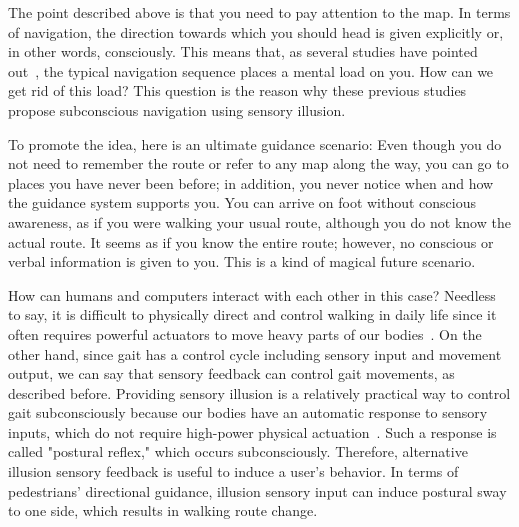 \documentclass{sigchi}
\begin{document}
The point described above is that you need to pay attention to the map. In terms of navigation, the direction towards which you should head is given explicitly or, in other words, consciously. This means that, as several studies have pointed out~\cite{Ghaem1997,PSYP:PSYP1043,1276842},
 the typical navigation sequence places a mental load on you. How can we get rid of this load? This question is the reason why these previous studies propose subconscious navigation using sensory illusion\cite{Tanikawa2012,%
TJP:TJP931,TJP:TJP1033,7460029,7989977,BENT2000157,Britton1993}.%

To promote the idea, here is an ultimate guidance scenario: Even though you do not need to remember the route or refer to any map along the way, you can go to places you have never been before; in addition, you never notice when and how the guidance system supports you. You can arrive on foot without conscious awareness, as if you were walking your usual route, although you do not know the actual route. It seems as if you know the entire route; however, no conscious or verbal information is given to you. This is a kind of magical future scenario.

How can humans and computers interact with each other in this case? Needless to say, it is difficult to physically direct and control walking in daily life since it often requires powerful actuators to move heavy parts of our bodies~\cite{doi:10.3109/03093648709078194,DOMINGO2009464}. On the other hand, since gait has a control cycle including sensory input and movement output, we can say that sensory feedback can control gait movements, as described before. Providing sensory illusion is a relatively practical way to control gait subconsciously because our bodies have an automatic response to sensory inputs, which do not require high-power physical actuation~\cite{Watanabe2010,Watanabe:2005:SII:1152399.1152406,Jones2008,Imamura:2011:HHW:2048259.2048265, Turchet2015, 7460029}. Such a response is called "postural reflex," which occurs subconsciously. Therefore, alternative illusion sensory feedback is useful to induce a user's behavior. In terms of pedestrians' directional guidance, illusion sensory input\cite{JPR:JPR167,pmid7845766,pmid25774143,Furukawa:2011:VFP:1959826.1959845} can induce postural sway to one side, which results in walking route change. 
\end{document}
